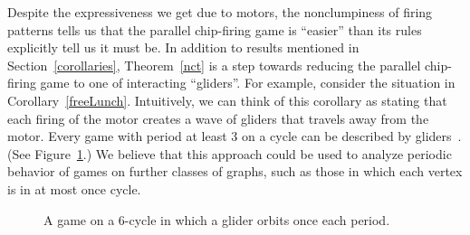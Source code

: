 Despite the expressiveness we get due to motors, the nonclumpiness of firing
patterns tells us that the parallel chip-firing game is ``easier'' than its
rules explicitly tell us it must be. In addition to results mentioned in
Section~\ref{corollaries}, Theorem~\ref{nct} is a step towards reducing the
parallel chip-firing game to one of interacting ``gliders''. For example,
consider the situation in Corollary~\ref{freeLunch}. Intuitively, we can think
of this corollary as stating that each firing of the motor creates a wave of
gliders that travels away from the motor. Every game with period at least 3 on
a cycle can be described by gliders~\cite{cycle}. (See Figure~\ref{cycleFig}.)
We believe that this approach could be used to analyze periodic behavior of
games on further classes of graphs, such as those in which each vertex is in at
most once cycle.

\begin{centering}
  \begin{figure}[tbh]
    \caption{A game on a 6-cycle in which a glider orbits once each period.}
    \label{cycleFig}
  \end{figure}
\end{centering}

